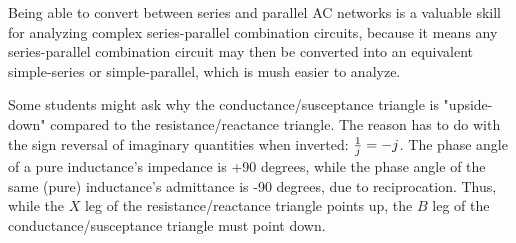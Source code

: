 Being able to convert between series and parallel AC networks is a valuable skill for analyzing complex series-parallel combination circuits, because it means any series-parallel combination circuit may then be converted into an equivalent simple-series or simple-parallel, which is mush easier to analyze.

Some students might ask why the conductance/susceptance triangle is "upside-down" compared to the resistance/reactance triangle.  The reason has to do with the sign reversal of imaginary quantities when inverted: ${1 \over j} = -j$.  The phase angle of a pure inductance's impedance is +90 degrees, while the phase angle of the same (pure) inductance's admittance is -90 degrees, due to reciprocation.  Thus, while the $X$ leg of the resistance/reactance triangle points up, the $B$ leg of the conductance/susceptance triangle must point down.




